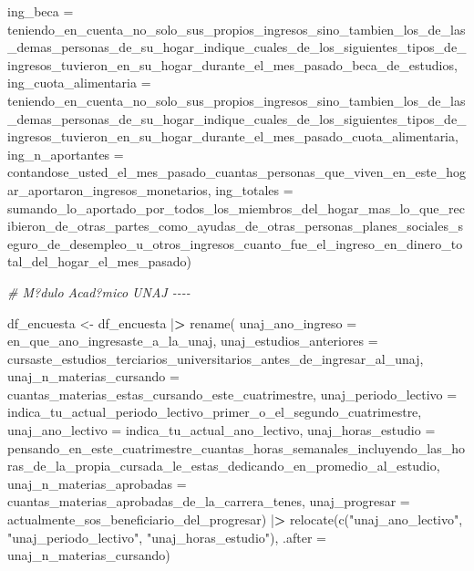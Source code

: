 \documentclass[
]{book}
\newenvironment{Shaded}{\begin{snugshade}}{\end{snugshade}}
\newcommand{\AttributeTok}[1]{\textcolor[rgb]{0.77,0.63,0.00}{#1}}
\newcommand{\CommentTok}[1]{\textcolor[rgb]{0.56,0.35,0.01}{\textit{#1}}}
\newcommand{\ErrorTok}[1]{\textcolor[rgb]{0.64,0.00,0.00}{\textbf{#1}}}
\newcommand{\FunctionTok}[1]{\textcolor[rgb]{0.00,0.00,0.00}{#1}}
\newcommand{\NormalTok}[1]{#1}
\newcommand{\OtherTok}[1]{\textcolor[rgb]{0.56,0.35,0.01}{#1}}
\newcommand{\SpecialCharTok}[1]{\textcolor[rgb]{0.00,0.00,0.00}{#1}}
\newcommand{\StringTok}[1]{\textcolor[rgb]{0.31,0.60,0.02}{#1}}
\theoremstyle{definition}
\theoremstyle{definition}
\theoremstyle{definition}
\theoremstyle{definition}
\theoremstyle{remark}
\begin{document}
\begin{Shaded}
\begin{Highlighting}[]
\AttributeTok{ing\_beca =}\NormalTok{ teniendo\_en\_cuenta\_no\_solo\_sus\_propios\_ingresos\_sino\_tambien\_los\_de\_las\_demas\_personas\_de\_su\_hogar\_indique\_cuales\_de\_los\_siguientes\_tipos\_de\_ingresos\_tuvieron\_en\_su\_hogar\_durante\_el\_mes\_pasado\_beca\_de\_estudios,}
\AttributeTok{ing\_cuota\_alimentaria =}\NormalTok{ teniendo\_en\_cuenta\_no\_solo\_sus\_propios\_ingresos\_sino\_tambien\_los\_de\_las\_demas\_personas\_de\_su\_hogar\_indique\_cuales\_de\_los\_siguientes\_tipos\_de\_ingresos\_tuvieron\_en\_su\_hogar\_durante\_el\_mes\_pasado\_cuota\_alimentaria,}
\AttributeTok{ing\_n\_aportantes =}\NormalTok{ contandose\_usted\_el\_mes\_pasado\_cuantas\_personas\_que\_viven\_en\_este\_hogar\_aportaron\_ingresos\_monetarios,}
\AttributeTok{ing\_totales =}\NormalTok{ sumando\_lo\_aportado\_por\_todos\_los\_miembros\_del\_hogar\_mas\_lo\_que\_recibieron\_de\_otras\_partes\_como\_ayudas\_de\_otras\_personas\_planes\_sociales\_seguro\_de\_desempleo\_u\_otros\_ingresos\_cuanto\_fue\_el\_ingreso\_en\_dinero\_total\_del\_hogar\_el\_mes\_pasado)}

\CommentTok{\# M?dulo Acad?mico UNAJ {-}{-}{-}{-}}

\NormalTok{df\_encuesta }\OtherTok{\textless{}{-}}\NormalTok{ df\_encuesta }\SpecialCharTok{|}\ErrorTok{\textgreater{}}
\FunctionTok{rename}\NormalTok{(}
\AttributeTok{unaj\_ano\_ingreso =}\NormalTok{ en\_que\_ano\_ingresaste\_a\_la\_unaj,}
\AttributeTok{unaj\_estudios\_anteriores =}\NormalTok{ cursaste\_estudios\_terciarios\_universitarios\_antes\_de\_ingresar\_al\_unaj,}
\AttributeTok{unaj\_n\_materias\_cursando =}\NormalTok{ cuantas\_materias\_estas\_cursando\_este\_cuatrimestre,}
\AttributeTok{unaj\_periodo\_lectivo =}\NormalTok{ indica\_tu\_actual\_periodo\_lectivo\_primer\_o\_el\_segundo\_cuatrimestre,}
\AttributeTok{unaj\_ano\_lectivo =}\NormalTok{ indica\_tu\_actual\_ano\_lectivo,}
\AttributeTok{unaj\_horas\_estudio =}\NormalTok{ pensando\_en\_este\_cuatrimestre\_cuantas\_horas\_semanales\_incluyendo\_las\_horas\_de\_la\_propia\_cursada\_le\_estas\_dedicando\_en\_promedio\_al\_estudio,}
\AttributeTok{unaj\_n\_materias\_aprobadas =}\NormalTok{ cuantas\_materias\_aprobadas\_de\_la\_carrera\_tenes,}
\AttributeTok{unaj\_progresar =}\NormalTok{ actualmente\_sos\_beneficiario\_del\_progresar) }\SpecialCharTok{|}\ErrorTok{\textgreater{}}
\FunctionTok{relocate}\NormalTok{(}\FunctionTok{c}\NormalTok{(}\StringTok{"unaj\_ano\_lectivo"}\NormalTok{,}
           \StringTok{"unaj\_periodo\_lectivo"}\NormalTok{,}
           \StringTok{"unaj\_horas\_estudio"}\NormalTok{), }\AttributeTok{.after =}\NormalTok{ unaj\_n\_materias\_cursando)}


\end{Highlighting}
\end{Shaded}
\end{document}
